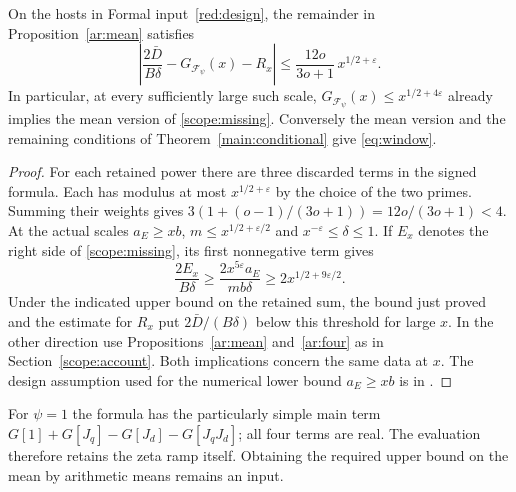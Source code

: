 \begin{corollary}\label{ar:meanhost}
On the hosts in Formal input~\ref{red:design}, the remainder in
Proposition~\ref{ar:mean} satisfies
\[
 \left|\frac{2\bar D}{B\delta}-G_{\mathcal F_\psi}(x)-R_x\right|
 \le \frac{12o}{3o+1}\,x^{1/2+\varepsilon}.
\]
In particular, at every sufficiently large such scale,
\(G_{\mathcal F_\psi}(x)\le x^{1/2+4\varepsilon}\) already implies
the mean version of \eqref{scope:missing}. Conversely the mean
version and the remaining conditions of
Theorem~\ref{main:conditional} give \eqref{eq:window}.
\end{corollary}
\begin{proof}
For each retained power there are three discarded terms in the
signed formula. Each has modulus at most \(x^{1/2+\varepsilon}\)
by the choice of the two primes. Summing their weights gives
\(3(1+(o-1)/(3o+1))=12o/(3o+1)<4\). At the actual scales
\(a_E\ge xb\), \(m\le x^{1/2+\varepsilon/2}\) and
\(x^{-\varepsilon}\le\delta\le1\). If \(E_x\) denotes the right
side of \eqref{scope:missing}, its first nonnegative term gives
\[
   \frac{2E_x}{B\delta}\ge
      \frac{2x^{5\varepsilon}a_E}{mb\delta}
           \ge 2x^{1/2+9\varepsilon/2}.
\]
Under the indicated upper bound on the retained sum, the bound
just proved and the estimate for \(R_x\) put \(2\bar D/(B\delta)\)
below this threshold for large \(x\). In the other direction use
Propositions~\ref{ar:mean} and~\ref{ar:four} as in
Section~\ref{scope:account}. Both implications concern the same
data at \(x\). The design assumption used for the numerical
lower bound \(a_E\ge xb\) is in
.
\end{proof}
For \(\psi=1\) the formula has the particularly simple main term
\(G[1]+G[J_q]-G[J_d]-G[J_qJ_d]\); all four terms are real.
The evaluation therefore retains the zeta ramp itself. Obtaining the
required upper bound on the mean by arithmetic means remains an input.

